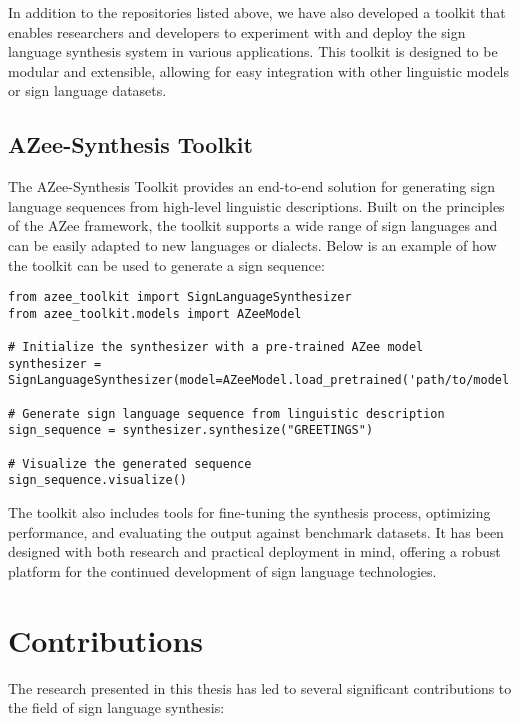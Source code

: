 \documentclass[../../main.tex]{subfiles}
\begin{document}
In addition to the repositories listed above, we have also developed a toolkit that enables researchers and developers to experiment with and deploy the sign language synthesis system in various applications. This toolkit is designed to be modular and extensible, allowing for easy integration with other linguistic models or sign language datasets.

\subsection*{AZee-Synthesis Toolkit}

The AZee-Synthesis Toolkit provides an end-to-end solution for generating sign language sequences from high-level linguistic descriptions. Built on the principles of the AZee framework, the toolkit supports a wide range of sign languages and can be easily adapted to new languages or dialects. Below is an example of how the toolkit can be used to generate a sign sequence:

\begin{verbatim}
from azee_toolkit import SignLanguageSynthesizer
from azee_toolkit.models import AZeeModel

# Initialize the synthesizer with a pre-trained AZee model
synthesizer = SignLanguageSynthesizer(model=AZeeModel.load_pretrained('path/to/model'))

# Generate sign language sequence from linguistic description
sign_sequence = synthesizer.synthesize("GREETINGS")

# Visualize the generated sequence
sign_sequence.visualize()
\end{verbatim}

The toolkit also includes tools for fine-tuning the synthesis process, optimizing performance, and evaluating the output against benchmark datasets. It has been designed with both research and practical deployment in mind, offering a robust platform for the continued development of sign language technologies.

\section{Contributions}
\label{sec:contributions}

The research presented in this thesis has led to several significant contributions to the field of sign language synthesis:
\end{document}
